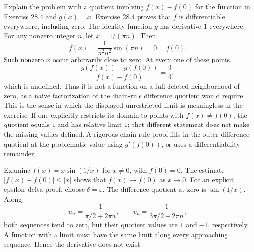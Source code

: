 \goal Explain the problem with a quotient involving $f(x)-f(0)$ for the function in Exercise 28.4 and $g(x)=x$.
Exercise 28.4 proves that $f$ is differentiable everywhere, including zero. The identity function $g$ has derivative $1$ everywhere.
For any nonzero integer $n$, let $x=1/(\pi n)$. Then
\[
 f(x)=\frac1{\pi^2n^2}\sin(\pi n)=0=f(0).
\]
Such nonzero $x$ occur arbitrarily close to zero.
At every one of these points,
\[
 \frac{g(f(x))-g(f(0))}{f(x)-f(0)}=\frac00,
\]
which is undefined. Thus it is not a function on a full deleted neighborhood of zero, as a naive factorization of the chain-rule difference quotient would require. This is the sense in which the displayed unrestricted limit is meaningless in the exercise.
If one explicitly restricts its domain to points with $f(x)\ne f(0)$, the quotient equals $1$ and has relative limit $1$; that different statement does not make the missing values defined. A rigorous chain-rule proof fills in the outer difference quotient at the problematic value using $g'(f(0))$, or uses a differentiability remainder.

\goal Examine $f(x)=x\sin(1/x)$ for $x\ne0$, with $f(0)=0$.
The estimate $|f(x)-f(0)|\le|x|$ shows that $f(x)\to f(0)$ as $x\to0$. For an explicit epsilon--delta proof, choose $\delta=\varepsilon$.
The difference quotient at zero is $\sin(1/x)$. Along
\[
 u_n=\frac1{\pi/2+2\pi n},\qquad
 v_n=\frac1{3\pi/2+2\pi n},
\]
both sequences tend to zero, but their quotient values are $1$ and $-1$, respectively. A function with a limit must have the same limit along every approaching sequence. Hence the derivative does not exist.

